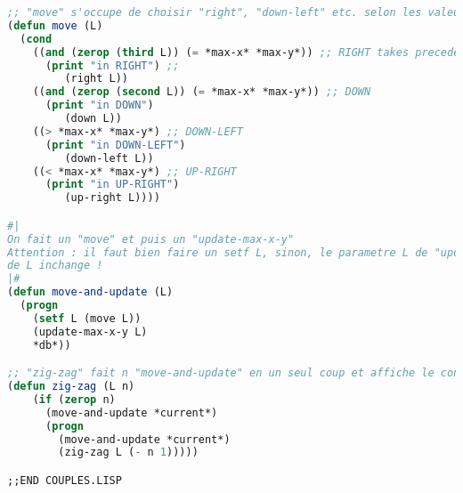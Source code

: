 \documentclass{article}
\begin{document}
\begin{lstlisting}[language=Lisp]
;; "move" s'occupe de choisir "right", "down-left" etc. selon les valeurs dans *current*
(defun move (L)
  (cond
    ((and (zerop (third L)) (= *max-x* *max-y*)) ;; RIGHT takes precedence over LEFT becuase it occurs first
      (print "in RIGHT") ;; 
         (right L))
    ((and (zerop (second L)) (= *max-x* *max-y*)) ;; DOWN
      (print "in DOWN") 
         (down L))
    ((> *max-x* *max-y*) ;; DOWN-LEFT
      (print "in DOWN-LEFT")  
         (down-left L))
    ((< *max-x* *max-y*) ;; UP-RIGHT
      (print "in UP-RIGHT") 
         (up-right L))))

#|
On fait un "move" et puis un "update-max-x-y"
Attention : il faut bien faire un setf L, sinon, le parametre L de "update-max-x-y utilise la valeur
de L inchange !
|#
(defun move-and-update (L)
  (progn
    (setf L (move L))
    (update-max-x-y L)
    *db*))

;; "zig-zag" fait n "move-and-update" en un seul coup et affiche le contenu de *db* (toutes les couples) 
(defun zig-zag (L n)
    (if (zerop n) 
      (move-and-update *current*)
      (progn
        (move-and-update *current*)
        (zig-zag L (- n 1)))))

;;END COUPLES.LISP

\end{lstlisting}
\end{document}
